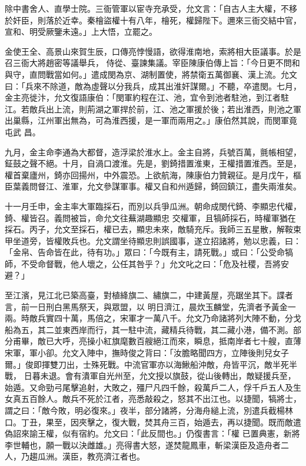 \begin{pinyinscope}
 除中書舍人、直學士院。三衙管軍以宦寺充承受，允文言：「自古人主大權，不移於奸臣，則落於近幸。秦檜盜權十有八年，檜死，權歸陛下。邇來三衙交結中官，宣和、明受厥鑒未遠。」上大悟，立罷之。



 金使王全、高景山來賀生辰，口傳亮悖慢語，欲得淮南地，索將相大臣議事。於是召三衙大將趙密等議舉兵，
 侍從、臺諫集議。宰臣陳康伯傳上旨：「今日更不問和與守，直問戰當如何。」遣成閔為京、湖制置使，將禁衛五萬御襄、漢上流。允文曰：「兵來不除道，敵為虛聲以分我兵，成其出淮奸謀爾。」不聽，卒遣閔。七月，金主亮徙汴，允文復語康伯：「閔軍約程在江、池，宜令到池者駐池，到江者駐江。若敵兵出上流，則荊湖之軍捍於前，江、池之軍援於後；若出淮西，則池之軍出巢縣，江州軍出無為，可為淮西援，是一軍而兩用之。」康伯然其說，而閔軍竟屯武
 昌。



 九月，金主命李通為大都督，造浮梁於淮水上。金主自將，兵號百萬，氈帳相望，鉦鼓之聲不絕。十月，自渦口渡淮。先是，劉錡措置淮東，王權措置淮西。至是，權首棄廬州，錡亦回揚州，中外震恐。上欲航海，陳康伯力贊親征。是月戊午，樞臣葉義問督江、淮軍，允文參謀軍事。權又自和州遁歸，錡回鎮江，盡失兩淮矣。



 十一月壬申，金主率大軍臨採石，而別以兵爭瓜洲。朝命成閔代錡、李顯忠代權，錡、權皆召。義問被旨，命允文往蕪湖趣顯忠
 交權軍，且犒師採石，時權軍猶在採石。丙子，允文至採石，權已去，顯忠未來，敵騎充斥。我師三五星散，解鞍束甲坐道旁，皆權敗兵也。允文謂坐待顯忠則誤國事，遂立招諸將，勉以忠義，曰：「金帛、告命皆在此，待有功。」眾曰：「今既有主，請死戰。」或曰：「公受命犒師，不受命督戰，他人壞之，公任其咎乎？」允文叱之曰：「危及社稷，吾將安避？」



 至江濱，見江北已築高臺，對植絳旗二、繡旗二，中建黃屋，亮踞坐其下。諜者言，前一日刑白黑馬祭天，與眾盟，以
 明日濟江，晨炊玉麟堂，先濟者予黃金一兩。時敵兵實四十萬，馬倍之，宋軍才一萬八千。允文乃命諸將列大陣不動，分戈船為五，其二並東西岸而行，其一駐中流，藏精兵待戰，其二藏小港，備不測。部分甫畢，敵已大呼，亮操小紅旗麾數百艘絕江而來，瞬息，抵南岸者七十艘，直薄宋軍，軍小卻。允文入陣中，撫時俊之背曰：「汝膽略聞四方，立陣後則兒女子爾。」俊即揮雙刀出，士殊死戰。中流官軍亦以海鰍船沖敵，舟皆平沉，敵半死半戰，
 日暮未退。會有潰軍自光州至，允文授以旗鼓，從山後轉出，敵疑援兵至，始遁。又命勁弓尾擊追射，大敗之，殭尸凡四千餘，殺萬戶二人，俘千戶五人及生女真五百餘人。敵兵不死於江者，亮悉敲殺之，怒其不出江也。以捷聞，犒將士，謂之曰：「敵今敗，明必復來。」夜半，部分諸將，分海舟縋上流，別遣兵截楊林口。丁丑，果至，因夾擊之，復大戰，焚其舟三百，始遁去，再以捷聞。既而敵遣偽詔來諭王權，似有宿約。允文曰：「此反間也。」仍復書言：「權
 已置典憲，新將李世輔也，願一戰以決雌雄。」亮得書大怒，遂焚龍鳳車，斬梁漢臣及造舟者二人，乃趨瓜洲。漢臣，教亮濟江者也。




\end{pinyinscope}
